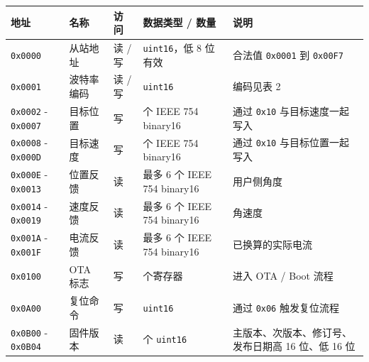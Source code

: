 \documentclass[
  chinese,
]{ctexart}
\newcounter{none} %
\begin{document}
{\def\LTcaptype{none} %
\begin{longtable}[]{@{}
  >{\raggedright\arraybackslash}p{}
  >{\raggedright\arraybackslash}p{}
  >{\raggedright\arraybackslash}p{}
  >{\raggedright\arraybackslash}p{}
  >{\raggedright\arraybackslash}p{}@{}}
\toprule\noalign{}
\begin{minipage}[b]{\linewidth}\raggedright
地址
\end{minipage} & \begin{minipage}[b]{\linewidth}\raggedright
名称
\end{minipage} & \begin{minipage}[b]{\linewidth}\raggedright
访问
\end{minipage} & \begin{minipage}[b]{\linewidth}\raggedright
数据类型 / 数量
\end{minipage} & \begin{minipage}[b]{\linewidth}\raggedright
说明
\end{minipage} \\
\midrule\noalign{}
\endhead
\bottomrule\noalign{}
\endlastfoot
\texttt{0x0000} & 从站地址 & 读 / 写 & \texttt{uint16}，低 8 位有效 &
合法值 \texttt{0x0001} 到 \texttt{0x00F7} \\
\texttt{0x0001} & 波特率编码 & 读 / 写 & \texttt{uint16} & 编码见表 2 \\
\texttt{0x0002} - \texttt{0x0007} & 目标位置 & 写 & 6 个 IEEE 754
binary16 & 通过 \texttt{0x10} 与目标速度一起写入 \\
\texttt{0x0008} - \texttt{0x000D} & 目标速度 & 写 & 6 个 IEEE 754
binary16 & 通过 \texttt{0x10} 与目标位置一起写入 \\
\texttt{0x000E} - \texttt{0x0013} & 位置反馈 & 读 & 最多 6 个 IEEE 754
binary16 & 用户侧角度 \\
\texttt{0x0014} - \texttt{0x0019} & 速度反馈 & 读 & 最多 6 个 IEEE 754
binary16 & 角速度 \\
\texttt{0x001A} - \texttt{0x001F} & 电流反馈 & 读 & 最多 6 个 IEEE 754
binary16 & 已换算的实际电流 \\
\texttt{0x0100} & OTA 标志 & 写 & 2 个寄存器 & 进入 OTA / Boot 流程 \\
\texttt{0x0A00} & 复位命令 & 写 & \texttt{uint16} & 通过 \texttt{0x06}
触发复位流程 \\
\texttt{0x0B00} - \texttt{0x0B04} & 固件版本 & 读 & 5 个 \texttt{uint16}
& 主版本、次版本、修订号、发布日期高 16 位、低 16 位 \\
\end{longtable}
}
\end{document}
